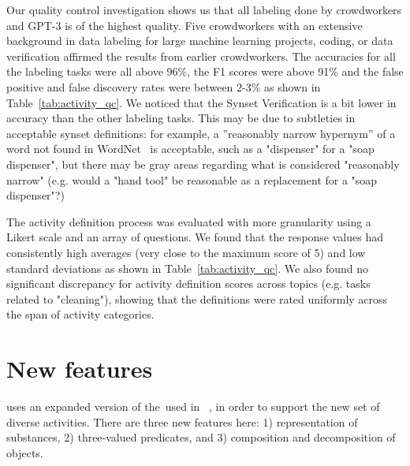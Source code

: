 Our quality control investigation shows us that all labeling done by crowdworkers and GPT-3 is of the highest quality. Five crowdworkers with an extensive background in data labeling for large machine learning projects, coding, or data verification affirmed the results from earlier crowdworkers. The accuracies for all the labeling tasks were all above 96\%, the F1 scores were above 91\% and the false positive and false discovery rates were between 2-3\% as shown in Table~\ref{tab:activity_qc}. We noticed that the Synset Verification is a bit lower in accuracy than the other labeling tasks. This may be due to subtleties in acceptable synset definitions: for example, a ''reasonably narrow hypernym'' of a word not found in WordNet~\cite{wordnet} is acceptable, such as a "dispenser" for a "soap dispenser", but there may be gray areas regarding what is considered "reasonably narrow" (e.g. would a "hand tool" be reasonable as a replacement for a "soap dispenser"?)

The activity definition process was evaluated with more granularity using a Likert scale and an array of questions. We found that the response values had consistently high averages (very close to the maximum score of 5) and low standard deviations as shown in Table~\ref{tab:activity_qc}. We also found no significant discrepancy for activity definition scores across topics (e.g. tasks related to "cleaning"), showing that the \bddl definitions were rated uniformly across the span of activity categories.

\section{New \bddl features}
\label{sec:bddl}

\benchmark uses an expanded version of the~\bddl used in \oldbenchmark~\cite{srivastava2021behavior}, in order to support the new set of diverse activities. There are three new features here: 1) representation of substances, 2) three-valued predicates, and 3) composition and decomposition of objects. %

